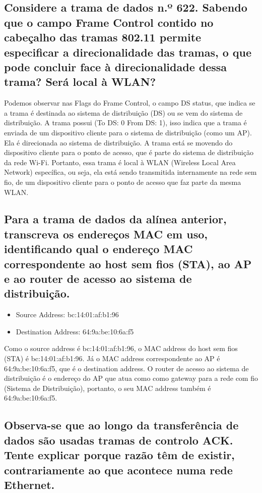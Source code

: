 \documentclass{article}
\begin{document}
\subsection{Considere a trama de dados n.º 622. Sabendo que o campo Frame Control
contido no cabeçalho das tramas 802.11 permite especificar a direcionalidade
das tramas, o que pode concluir face à direcionalidade dessa trama? Será local à
WLAN?}

Podemos observar nas Flags do Frame Control, o campo DS status, que indica se a trama é destinada ao sistema de distribuição (DS) ou se vem do sistema de distribuição.
A trama possui (To DS: 0 From DS: 1), isso indica que a trama é enviada de um dispositivo cliente para o sistema de distribuição (como um AP). Ela é direcionada ao sistema de distribuição. A trama está se movendo do dispositivo cliente para o ponto de acesso, que é parte do sistema de distribuição da rede Wi-Fi. Portanto, essa trama é local à WLAN (Wireless Local Area Network) específica, ou seja, ela está sendo transmitida internamente na rede sem fio, de um dispositivo cliente para o ponto de acesso que faz parte da mesma WLAN.

\subsection{Para a trama de dados da alínea anterior, transcreva os endereços MAC em uso,
identificando qual o endereço MAC correspondente ao host sem fios (STA), ao AP
e ao router de acesso ao sistema de distribuição.}

\begin{itemize}
    \item Source Address: bc:14:01:af:b1:96
    \item Destination Address: 64:9a:be:10:6a:f5
\end{itemize}

Como o source address é bc:14:01:af:b1:96, o MAC address do host sem fios (STA) é bc:14:01:af:b1:96. Já o MAC address correspondente ao AP é 64:9a:be:10:6a:f5, que é o destination address. O router de acesso ao sistema de distribuição é o endereço do AP que atua como como gateway para a rede com fio (Sistema de Distribuição), portanto, o seu MAC address também é 64:9a:be:10:6a:f5.

\subsection{Observa-se que ao longo da transferência de dados são usadas tramas de
controlo ACK. Tente explicar porque razão têm de existir, contrariamente ao que
acontece numa rede Ethernet.}
\end{document}
